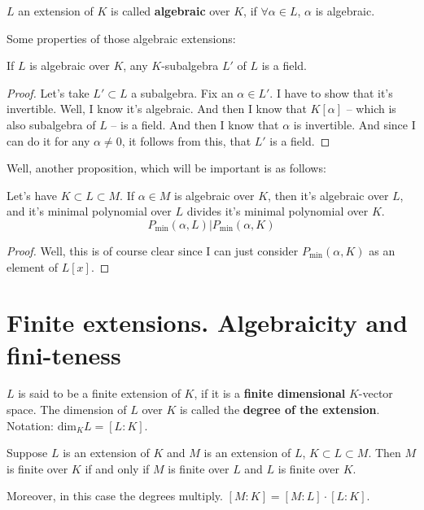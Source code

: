 \begin{definition}
$L$ an extension of $K$ is called \textbf{algebraic} over $K$, if $\forall \alpha\in L$, $\alpha$ is algebraic. 
\end{definition}

Some properties of those algebraic extensions:

\begin{proposition}
If $L$ is algebraic over $K$, any $K$-subalgebra $L'$ of $L$ is a field. 
\end{proposition}

\begin{proof}
Let's take $L'\subset L$ a subalgebra. Fix an $\alpha \in L'$. I have to show that it's invertible. Well, I know it's algebraic. And then I know that $K[\alpha]$ -- which is also subalgebra of $L$ -- is a field. And then I know that $\alpha$ is invertible. And since I can do it for any $\alpha \neq 0$, it follows from this, that $L'$ is a field. 
\end{proof}

Well, another proposition, which will be important is as follows: 

\begin{proposition}
Let's have $K\subset L\subset M$. If $\alpha \in M$ is algebraic over $K$, then it's algebraic over $L$, and it's minimal polynomial over $L$ divides it's minimal polynomial over $K$. 
\[ P_{\text{min}}(\alpha,L) | P_{\text{min}}(\alpha,K) \]
\end{proposition}

\begin{proof} Well, this is of course clear since I can just consider $P_{\text{min}}(\alpha,K)$ as an element of $L[x]$.
\end{proof}

\section{Finite extensions. Algebraicity and fini-teness}

\begin{definition}
$L$ is said to be a finite extension of $K$, if it is a \textbf{finite dimensional} $K$-vector space. The dimension of $L$ over $K$ is called the \textbf{degree of the extension}. Notation: $\text{dim}_KL=[L:K]$.
\end{definition}

\begin{theorem}
\label{t1}
Suppose $L$ is an extension of $K$ and $M$ is an extension of $L$, $K\subset L\subset M$. Then $M$ is finite over $K$ if and only if $M$ is finite over $L$ and $L$ is finite over $K$. 

Moreover, in this case the degrees multiply. $[M:K]=[M:L]\cdot[L:K]$. 
\end{theorem}

